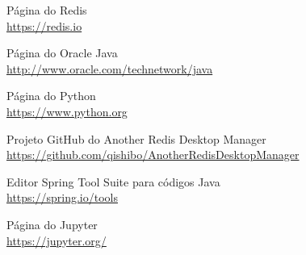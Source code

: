 \documentclass[a4paper,11pt]{article}
\begin{document}
\begin{thebibliography}{8}
  Página do Redis \\
  \url{https://redis.io}

  Página do Oracle Java \\
  \url{http://www.oracle.com/technetwork/java}
  
  Página do Python \\
  \url{https://www.python.org}

  Projeto GitHub do Another Redis Desktop Manager \\
  \url{https://github.com/qishibo/AnotherRedisDesktopManager}

  Editor Spring Tool Suite para códigos Java \\
  \url{https://spring.io/tools}

  Página do Jupyter \\
  \url{https://jupyter.org/}

  
\end{thebibliography}
  
\end{document}
